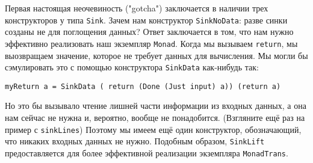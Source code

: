 Первая настоящая неочевиность ("gotcha")  заключается в наличии трех конструкторов у
типа \lstinline=Sink=. Зачем нам конструктор \lstinline=SinkNoData=: разве синки
созданы не для поглощения данных? Ответ заключается в том, что нам нужно эффективно
реализовать наш экземпляр \lstinline=Monad=. Когда мы вызываем \lstinline=return=, мы
выозвращаем значение, которое не требует данных для вычисления. Мы могли бы сэмулировать
это с помощью конструктора \lstinline=SinkData= как-нибудь так:
\begin{lstlisting}
myReturn a = SinkData ( return (Done (Just input) a)) (return a)
\end{lstlisting}
Но это бы вызывало чтение лишней части информации из входных данных, а она нам сейчас не
нужна и,
вероятно, вообще не понадобится. (Взгляните ещё раз на пример с \lstinline=sinkLines=)
Поэтому мы имеем ещё один конструктор, обозначающий, что никаких входных данных не нужно.
Подобным образом, \lstinline=SinkLift= предоставляется для более эффективной реализации
экземпляра \lstinline=MonadTrans=.

